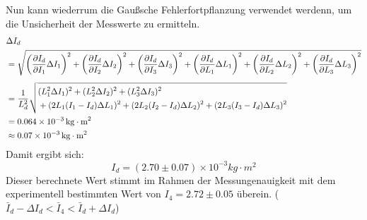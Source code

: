 \documentclass{report}
\begin{document}
Nun kann wiederrum die Gaußsche Fehlerfortpflanzung verwendet werdenn, um die Unsicherheit der Messwerte zu ermitteln.
\begin{equation}
\label{eq:UnsDiag}
\begin{split}
&\Delta I_d\\
&= \sqrt{
\left(\frac{\partial I_d}{\partial I_1}\Delta I_1\right)^2 +
\left(\frac{\partial I_d}{\partial I_2}\Delta I_2\right)^2 +
\left(\frac{\partial I_d}{\partial I_3}\Delta I_3\right)^2 +
\left(\frac{\partial I_d}{\partial L_1}\Delta L_1\right)^2 +
\left(\frac{\partial I_d}{\partial L_2}\Delta L_2\right)^2 +
\left(\frac{\partial I_d}{\partial L_3}\Delta L_3\right)^2
} \\[1ex]
&= \frac{1}{L_d^2} 
\sqrt{%
\begin{aligned}
& (L_1^2 \Delta I_1)^2 + (L_2^2 \Delta I_2)^2 + (L_3^2 \Delta I_3)^2 \\ 
&+ (2 L_1 (I_1 - I_d) \Delta L_1)^2 + (2 L_2 (I_2 - I_d) \Delta L_2)^2 + (2 L_3 (I_3 - I_d) \Delta L_3)^2
\end{aligned}%
} \\
&= \qty{0.064e-3}{kg \cdot m^2} \\
&\approx \qty{0.07e-3}{kg \cdot m^2} 
\end{split}
\end{equation}
Damit ergibt sich:
\begin{equation}
    \boxed{I_d = (2.70 \pm 0.07) \times 10^{-3} \si{kg \cdot m^2}}
    \label{eq:DiagTraegheitsmomentExpBer}
\end{equation}
Dieser berechnete Wert stimmt im Rahmen der Messungenauigkeit mit dem experimentell bestimmten Wert von $I_4 = 2.72\pm0.05$ überein.
($\bar{I}_d - \Delta I_d < \bar{I}_4 < \bar{I}_d + \Delta I_d$)
\end{document}
